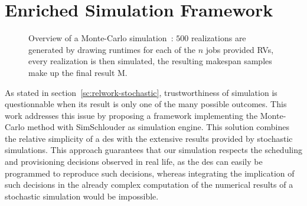 \documentclass[10pt,conference,compsocconf]{IEEEtran}
\begin{document}

\section{Enriched Simulation Framework}\label{sec:enriched-sim}

\begin{figure}
	\centering
	\resizebox{0.5\textwidth}{!}{%
		
		}
\caption{Overview of a Monte-Carlo simulation~: $500$ realizations are generated
by drawing runtimes for each of the $n$ jobs provided RVs, every realization is
then simulated, the resulting makespan samples make up the final result M.}\label{fig:mc-process}
\end{figure}



As stated in  section~\ref{sc:relwork-stochastic}, trustworthiness of simulation
is questionnable when its result is only one of the many possible outcomes. This
work addresses this issue by  proposing a framework implementing the Monte-Carlo
method  with SimSchlouder  as  simulation engine.   This  solution combines  the
relative  simplicity  of a  \ac{des}  with  the  extensive results  provided  by
stochastic simulations.   This approach guarantees that  our simulation respects
the scheduling and provisioning decisions observed in real life, as the \ac{des}
can easily  be programmed to  reproduce such decisions, whereas  integrating the
implication  of  such  decisions  in  the already  complex  computation  of  the
numerical results of a stochastic simulation would be impossible.
\end{document}
